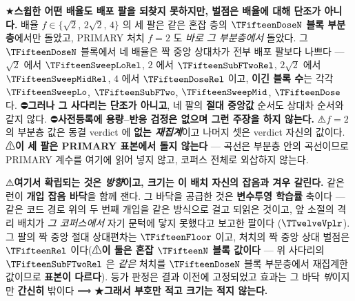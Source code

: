 \documentclass[11pt]{report}
\numberwithin{equation}{chapter}
\numberwithin{figure}{chapter}
\numberwithin{table}{chapter}
\begin{document}
★\textbf{스윕한 어떤 배율도 배포 팔을 되찾지 못하지만, 벌점은 배율에 대해 단조가 아니다.}
배율 $f \in \{\sqrt{2},\, 2\sqrt{2},\, 4\}$ 의 세 팔은 같은 혼잡 층의
\textbf{$\TFifteenDoseN$ 블록 부분층}에서만 돌았고, PRIMARY 처치 $f = 2$ 도 \emph{바로 그
부분층에서} 돌았다. 그 $\TFifteenDoseN$ 블록에서 네 배율은 짝 중앙 상대차가 전부 배포
팔보다 나쁘다 --- $\sqrt{2}$ 에서 $\TFifteenSweepLoRel$, $2$ 에서 $\TFifteenSubFTwoRel$,
$2\sqrt{2}$ 에서 $\TFifteenSweepMidRel$, $4$ 에서 $\TFifteenDoseRel$ 이고, \textbf{이긴 블록 수}는 각각
$\TFifteenSweepLo$, $\TFifteenSubFTwo$, $\TFifteenSweepMid$, $\TFifteenDose$ 다.
⛔\textbf{그러나 그 사다리는 단조가 아니고}, 네 팔의 \textbf{절대 중앙값} 순서도 상대차
순서와 같지 않다. ⛔\textbf{사전등록에 용량--반응 검정은 없으며 그런 주장을 하지 않는다.}
⚠$f = 2$ 의 부분층 값은 동결 verdict 에 \textbf{없는 \emph{재집계}}이고 나머지 셋은
verdict 자신의 값이다. ⚠\textbf{이 세 팔은 PRIMARY 표본에서 돌지 않는다} --- 곡선은
부분층 안의 곡선이므로 PRIMARY 계수를 여기에 읽어 넣지 않고, 코퍼스 전체로 외삽하지 않는다.

⚠\textbf{여기서 확립되는 것은 \emph{방향}이고, 크기는 이 배치 자신의 잡음과 겨우 갈린다.}
같은 런이 \textbf{개입 잡음 바닥}을 함께 잰다. 그 바닥을 공급한 것은 \textbf{변수투영
학습률} 축이다 --- 같은 코드 경로 위의 두 번째 개입을 같은 방식으로 걸고 되읽은 것이고,
앞 소절의 격리 배치가 \emph{그 코퍼스에서} 자기 문턱에 닿지 못했다고 보고한 팔이다
($\TTwelveVplr$). 그 팔의 짝 중앙 절대 상대편차는 $\TFifteenFloor$ 이고, 처치의 짝 중앙
상대 벌점은 $\TFifteenRel$ 이다(⚠\textbf{이 둘은 혼잡 $\TFifteenN$ 블록 값이다} --- 위
사다리의 $\TFifteenSubFTwoRel$ 은 \emph{같은} 처치를 $\TFifteenDoseN$ 블록 부분층에서
재집계한 값이므로 \textbf{표본이 다르다}). 등가 판정은 결과 이전에 고정되었고 효과는 그
바닥 \emph{밖}이지만 \textbf{간신히} 밖이다 ⟹ ★\textbf{그래서 부호만 적고 크기는 적지
않는다.}
\end{document}
